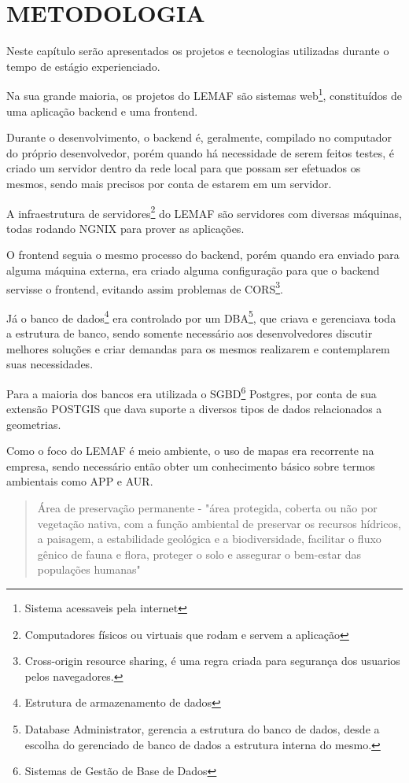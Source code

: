 \chapter{METODOLOGIA}
\label{cap:desenvolvimento}

Neste capítulo serão apresentados os projetos e tecnologias utilizadas durante o tempo de estágio experienciado.

Na sua grande maioria, os projetos do LEMAF são sistemas web\footnote{Sistema acessaveis pela internet}, constituídos de uma aplicação backend e uma frontend.

Durante o desenvolvimento, o backend é, geralmente, compilado no computador do próprio desenvolvedor, porém quando há necessidade de serem feitos testes, é criado um servidor dentro da rede local para que possam ser efetuados os mesmos, sendo mais precisos por conta de estarem em um servidor.

A infraestrutura de servidores\footnote{Computadores físicos ou virtuais que rodam e servem a aplicação} do LEMAF são servidores com diversas máquinas, todas rodando NGNIX para prover as aplicações.

O frontend seguia o mesmo processo do backend, porém quando era enviado para alguma máquina externa, era criado alguma configuração para que o backend servisse o frontend, evitando assim problemas de CORS\footnote{Cross-origin resource sharing, é uma regra criada para segurança dos usuarios pelos navegadores.}.

Já o banco de dados\footnote{Estrutura de armazenamento de dados} era controlado por um DBA\footnote{Database Administrator, gerencia a estrutura do banco de dados, desde a escolha do gerenciado de banco de dados a estrutura interna do mesmo.}, que criava e gerenciava toda a estrutura de banco, sendo somente necessário aos desenvolvedores discutir melhores soluções e criar demandas para os mesmos realizarem e contemplarem suas necessidades.

Para a maioria dos bancos era utilizada o SGBD\footnote{ Sistemas de Gestão de Base de Dados} Postgres, por conta de sua extensão POSTGIS que dava suporte a diversos tipos de dados relacionados a geometrias.

Como o foco do LEMAF é meio ambiente, o uso de mapas era recorrente na empresa, sendo necessário então obter um conhecimento básico sobre termos ambientais como APP e AUR.

\begin{quote}
    Área de preservação permanente - "área protegida, coberta ou não por vegetação nativa, com a função ambiental de preservar os recursos hídricos, a paisagem, a estabilidade geológica e a biodiversidade, facilitar o fluxo gênico de fauna e flora, proteger o solo e assegurar o bem-estar das populações humanas"\cite{brasil2012}
\end{quote}

